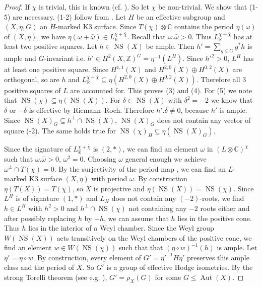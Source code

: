 \documentclass[a4paper]{amsart}
\theoremstyle{definition}
\theoremstyle{plain}
\DeclareMathOperator{\NS}{NS}
\DeclareMathOperator{\Aut}{Aut}
\newcommand{\RR}{\mathbb{R}}
\newcommand{\CC}{\mathbb{C}}
\newcommand{\ZZ}{\mathbb{Z}}
\begin{document}
\begin{proof}
  If $\chi$ is trivial, this is known (cf. \cite[4.2, 4.3]{nikulin1980}).
  So let $\chi$ be non-trivial. We show that (1-5) are necessary. (1-2) follow from \cite[4.2]{nikulin1980}. Let $H$ be an effective subgroup and $(X,\eta,G)$ an $H$-marked K3 surface.
  Since $T(\chi)\otimes \CC$ contains the period $\eta(\omega)$ of $(X,\eta)$, we have $\eta(\omega+\bar \omega) \in L_\RR^{\chi+\bar \chi}$.
  Recall that $\omega.\bar \omega >0$. Thus $L_\RR^{\chi+\bar \chi}$ has at least two positive squares.
  Let $h \in \NS(X)$ be ample. Then $h' = \sum_{g\in G} g^*h$ is ample and $G$-invariant i.e. $h' \in H^2(X,\ZZ)^G=\eta^{-1}(L^H)$. Since $h'^2>0$, $L^H$ has at least one positive square. Since $H^{1,1}(X)$ and $H^{2,0}(X)\oplus H^{0,2}(X)$ are orthogonal, so are $h$ and $L_\RR^{\chi+\bar \chi}\subseteq \eta(H^{2,0}(X)\oplus H^{0,2}(X))$. Therefore all $3$ positive squares of $L$ are accounted for. This proves (3) and (4).
  For (5) we note that $\NS(\chi)\subseteq \eta(\NS(X))$.
  For $\delta \in \NS(X)$ with $\delta^2=-2$ we know that $\delta$ or $-\delta$ is effective by Riemann--Roch.
  Therefore $h'.\delta \neq 0$, because $h'$ is ample.
  Since $\NS(X)_G \subseteq h^\perp \cap \NS(X)$,
  $\NS(X)_G$ does not contain any vector of square (-2).
  The same holds true for $\NS(\chi)_H\subseteq \eta(\NS(X)_G)$.

Since the signature of $L^{\chi+\bar\chi}_\RR$ is $(2,*)$, we can find an element $\omega$ in $(L\otimes \CC)^\chi$ such that
  $\omega.\bar \omega>0$, $\omega^2=0$. Choosing $\omega$ general enough we achieve $\omega^\perp \cap T(\chi) = 0$. By the surjectivity of the period map \cite[VII (14.1)]{bhpv}, we can find an $L$-marked K3 surface $(X,\eta)$ with period $\omega$.
  By construction $\eta(T(X)) = T(\chi)$, so $X$ is projective and $\eta(\NS(X)) = \NS(\chi)$.
Since $L^H$ is of signature $(1,*)$ and $L_H$ does not contain any $(-2)$-roots, we find $h \in L^H$ with $h^2>0$ and $h^\perp \cap \NS(\chi)$ not containing any $-2$ roots either and after possibly replacing $h$ by $-h$, we can assume that $h$ lies in the positive cone. Thus $h$ lies in the interior of a Weyl chamber.
Since the Weyl group $W(\NS(X))$ acts transitively on the Weyl chambers of the positive cone, we find an element $w \in W(\NS(\chi))$ such that that $(\eta\circ w)^{-1}(h)$ is ample. Let $\eta'= \eta\circ w$. By construction, every element of $G' = \eta'^{-1} H \eta'$
preserves this ample class and the period of $X$. So $G'$ is a group of effective Hodge isometries. By the strong Torelli theorem (see e.g. \cite[VIII \S 11]{bhpv}), $G' = \rho_X(G)$ for some $G \leq \Aut(X)$.

\end{proof}
\end{document}
